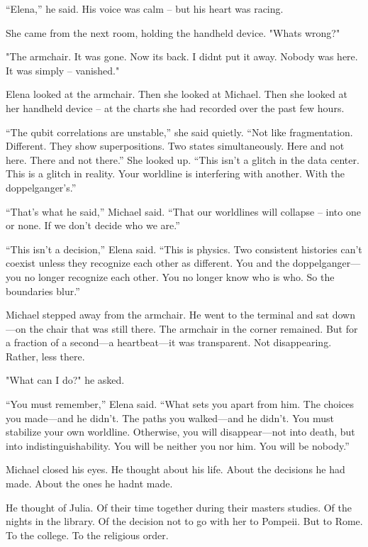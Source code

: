 \documentclass[
]{article}
\begin{document}
``Elena,'' he said. His voice was calm -- but his heart was racing.

She came from the next room, holding the handheld device. "What\textquotesingle s wrong?"

"The armchair. It was gone. Now it\textquotesingle s back. I didn\textquotesingle t put it away. Nobody was here. It was simply -- vanished."

Elena looked at the armchair. Then she looked at Michael. Then she looked at her handheld device -- at the charts she had recorded over the past few hours.

``The qubit correlations are unstable,'' she said quietly. ``Not like fragmentation. Different. They show superpositions. Two states simultaneously. Here and not here. There and not there.'' She looked up. ``This isn't a glitch in the data center. This is a glitch in reality. Your worldline is interfering with another. With the doppelganger's.''

``That's what he said,'' Michael said. ``That our worldlines will collapse -- into one or none. If we don't decide who we are.''

``This isn't a decision,'' Elena said. ``This is physics. Two consistent histories can't coexist unless they recognize each other as different. You and the doppelganger---you no longer recognize each other. You no longer know who is who. So the boundaries blur.''

Michael stepped away from the armchair. He went to the terminal and sat down---on the chair that was still there. The armchair in the corner remained. But for a fraction of a second---a heartbeat---it was transparent. Not disappearing. Rather, less there.

"What can I do?" he asked.

``You must remember,'' Elena said. ``What sets you apart from him. The choices you made---and he didn't. The paths you walked---and he didn't. You must stabilize your own worldline. Otherwise, you will disappear---not into death, but into indistinguishability. You will be neither you nor him. You will be nobody.''

Michael closed his eyes. He thought about his life. About the decisions he had made. About the ones he hadn\textquotesingle t made.

He thought of Julia. Of their time together during their master\textquotesingle s studies. Of the nights in the library. Of the decision not to go with her to Pompeii. But to Rome. To the college. To the religious order.
\end{document}
